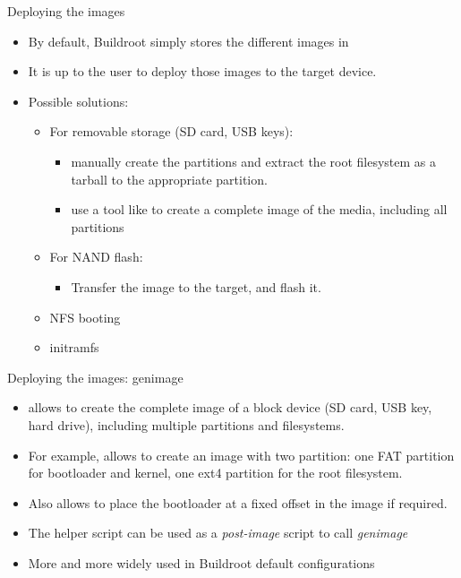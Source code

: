 \begin{frame}{Deploying the images}
  \begin{itemize}
  \item By default, Buildroot simply stores the different images in
  \item It is up to the user to deploy those images to the target
    device.
  \item Possible solutions:
    \begin{itemize}
    \item For removable storage (SD card, USB keys):
      \begin{itemize}
      \item manually create the partitions and extract the root
        filesystem as a tarball to the appropriate partition.
      \item use a tool like  to create a complete image
        of the media, including all partitions
      \end{itemize}
    \item For NAND flash:
      \begin{itemize}
      \item Transfer the image to the target, and flash it.
      \end{itemize}
    \item NFS booting
    \item initramfs
    \end{itemize}
  \end{itemize}
\end{frame}

\begin{frame}{Deploying the images: genimage}
  \begin{itemize}
  \item {} allows to create the complete image of a block
    device (SD card, USB key, hard drive), including multiple
    partitions and filesystems.
  \item For example, allows to create an image with two partition: one
    FAT partition for bootloader and kernel, one ext4 partition for
    the root filesystem.
  \item Also allows to place the bootloader at a fixed offset in the
    image if required.
  \item The helper script  can be
    used as a {\em post-image} script to call {\em genimage}
  \item More and more widely used in Buildroot default configurations
  \end{itemize}
\end{frame}

